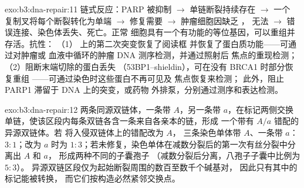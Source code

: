 \begin{solution}{exo:b3:dna-repair:11}
链式反应：PARP 被抑制 $\to$ 单链断裂持续存在 $\to$ 一个
复制叉将每个断裂转化为单端
$\to$ 修复需要 $\to$ 肿瘤细胞因缺乏 ，
无法 $\to$ 错误连接、染色体丢失、死亡。正常
细胞具有一个有功能的等位基因，可以重组并存活。抗性：
（1）\emph{} 上的第二次突变恢复了阅读框
并恢复了蛋白质功能——可通过对肿瘤或
血液中循环的肿瘤 DNA 测序检测，并通过照射后  焦点的重现检测；
（2）阻断末端切除的蛋白丢失
（53BP1--shieldin），可在没有 BRCA1 时部分恢复重组
——可通过染色时这些蛋白不再可见及  焦点恢复来检测；
此外，阻止 PARP1 滞留于 DNA 上的突变，或药物
外排泵，分别通过测序和表达检测。
\end{solution}

\begin{solution}{exo:b3:dna-repair:12}
两条同源双链体，一条带 $A$，另一条带 $a$，在标记两侧交换
单链，使该区段内每条双链各含一条来自各亲本的链，形成
一个带有 $A/a$ 错配的异源双链体。若
将入侵双链体上的错配改为 $A$，
三条染色单体带 $A$、一条带 $a$：$3{:}1$；改为 $a$ 时为
$1{:}3$；若未修复，染色单体在减数分裂后的第一次有丝分裂中分离出 $A$ 和 $a$，
形成两种不同的子囊孢子
（减数分裂后分离，八孢子子囊中比例为 $5{:}3$）。
异源双链区段仅为起始断裂周围的数百至数千个碱基对，
因此只有其中的标记能被转换，
而它们按构造必然紧邻交换点。
\end{solution}

